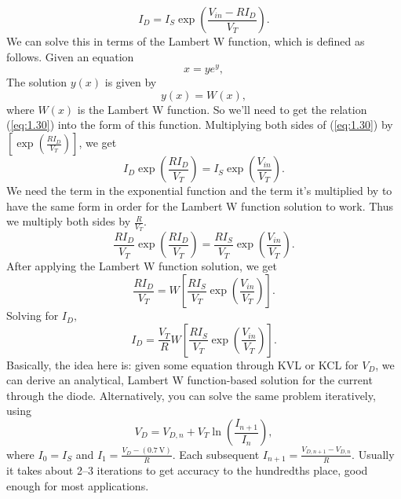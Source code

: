 \begin{equation}
\label{eq:1.30}
I_{D} = I_{S} \exp \left( \frac{V_{in} - R I_{D}}{V_{T}} \right).
\end{equation}
We can solve this in terms of the Lambert W function, which is defined as follows. Given an equation
\begin{equation}
\label{eq:1.31}
x = y e^{y},
\end{equation}
The solution $y(x)$ is given by
\begin{equation}
\label{eq:1.32}
y(x) = W(x),
\end{equation}
where $W(x)$ is the Lambert W function. So we'll need to get the relation (\cref{eq:1.30}) into the form of this function.
Multiplying both sides of (\cref{eq:1.30}) by $\left[ \exp \left( \frac{R I_{D}}{V_{T}} \right) \right]$, we get
\begin{equation}
\label{eq:1.33}
I_{D} \exp \left( \frac{R I_{D}}{V_{T}} \right) = I_{S} \exp \left( \frac{V_{in}}{V_{T}} \right).
\end{equation}
We need the term in the exponential function and the term it's multiplied by to have the same form in order for the Lambert W function solution to work. Thus we multiply both sides by $\frac{R}{V_{T}}$.
\begin{equation}
\label{eq:1.34}
\frac{R I_{D}}{V_{T}} \exp \left( \frac{R I_{D}}{V_{T}} \right) = \frac{R I_{S}}{V_{T}} \exp \left( \frac{V_{in}}{V_{T}} \right).
\end{equation}
After applying the Lambert W function solution, we get
\begin{equation}
\label{eq:1.35}
\frac{R I_{D}}{V_{T}} = W \left[ \frac{R I_{S}}{V_{T}} \exp \left( \frac{V_{in}}{V_{T}} \right) \right].
\end{equation}
Solving for $I_{D},$
\begin{equation}
\label{eq:1.36}
I_{D} = \frac{V_{T}}{R} W \left[ \frac{R I_{S}}{V_{T}} \exp \left( \frac{V_{in}}{V_{T}} \right) \right].
\end{equation}
Basically, the idea here is: given some equation through KVL or KCL for $V_{D}$, we can derive an analytical, Lambert W function-based solution for the current through the diode. Alternatively, you can solve the same problem iteratively, using
\begin{equation}
\label{eq:1.37}
V_{D} = V_{D,n} + V_{T} \ln \left( \frac{I_{n+1}}{I_{n}} \right),
\end{equation}
where $I_{0} = I_{S}$ and $I_{1} = \frac{ V_{D} - \left( \SI{0.7}{\volt} \right) }{R}$. Each subsequent $I_{n+1} = \frac{ V_{D,n+1} - V_{D,n} }{R}$. Usually it takes about 2--3 iterations to get accuracy to the hundredths place, good enough for most applications.
